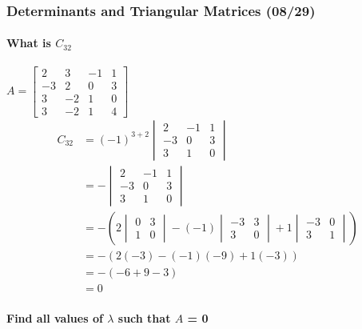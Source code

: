\documentclass[
  letterpaper,
  DIV=11,
  numbers=noendperiod]{scrartcl}
\let\oldparagraph\paragraph
\renewcommand{\paragraph}[1]{\oldparagraph{#1}\mbox{}}
\begin{document}
\newpage{}

\hypertarget{determinants-and-triangular-matrices-0829}{%
\subsubsection{Determinants and Triangular Matrices
(08/29)}\label{determinants-and-triangular-matrices-0829}}

\hypertarget{what-is-c_32}{%
\paragraph{\texorpdfstring{What is
\(C_{32}\)}{What is C\_\{32\}}}\label{what-is-c_32}}

\(A = \begin{bmatrix}2 & 3 & -1 & 1 \\ -3 & 2 & 0 & 3 \\ 3 & -2 & 1 & 0 \\ 3 & -2 & 1 & 4 \end{bmatrix}\)
\begin{align*}
C_{32} &= (-1)^{3+2}\begin{vmatrix}2 & -1 & 1 \\ -3 & 0 & 3 \\ 3 & 1 & 0\end{vmatrix} \\
&= -\begin{vmatrix}2 & -1 & 1 \\ -3 & 0 & 3 \\ 3 & 1 & 0\end{vmatrix} \\
&= -\left(2\begin{vmatrix}0 & 3 \\ 1 & 0\end{vmatrix}-(-1)\begin{vmatrix}-3 & 3 \\ 3 & 0\end{vmatrix}+1\begin{vmatrix}-3 & 0 \\ 3 & 1\end{vmatrix}\right) \\
&= -\left(2(-3)-(-1)(-9)+1(-3)\right) \\
&= -(-6+9-3) \\
&= 0
\end{align*}

\hypertarget{find-all-values-of-lambda-such-that-a-0}{%
\paragraph{\texorpdfstring{Find all values of \(\lambda\) such that
\textbar{}\(A\)\textbar{} =
0}{Find all values of \textbackslash lambda such that \textbar A\textbar{} = 0}}\label{find-all-values-of-lambda-such-that-a-0}}
\end{document}
